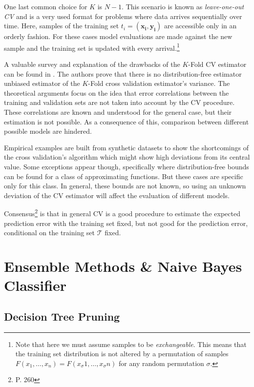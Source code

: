One last common choice for $K$ is $N-1$.
This scenario is known as \textit{leave-one-out CV} and is a very used format for problems where data arrives sequentially over time.
Here, samples of the training set $t_i = ( \boldsymbol{x_i} , \boldsymbol{y_i} )$ are accessible only in an orderly fashion.
For these cases model evaluations are made against the new sample and the training set is updated with every arrival.\footnote{Note that here we must assume samples to be \textit{exchangeable}.
    This means that the training set distribution is not altered by a permutation of samples $F(x_1,\ldots,x_n ) = F(x_\sigma{1},\ldots,x_\sigma{n})$ for any random permutation $\sigma$.}

A valuable survey and explanation of the drawbacks of the $K$-Fold CV estimator can be found in \citep{bengio-unbiasedCvEstimator}.
The authors prove that there is no distribution-free estimator unbiased estimator of the $K$-Fold cross validation estimator's variance.
The theoretical arguments focus on the idea that error correlations between the training and validation sets are not taken into account by the CV procedure.
These correlations are known and understood for the general case, but their estimation is not possible.
As a consequence of this, comparison between different possible models are hindered.

Empirical examples are built from synthetic datasets to show the shortcomings of the cross validation's algorithm which might show high deviations from its central value.
Some exceptions appear though, specifically where distribution-free bounds can be found for a class of approximating functions.
But these cases are specific only for this class.
In general, these bounds are not known, so using an unknown deviation of the CV estimator will affect the evaluation of different models.

Consensus\footnote{\citep{hastie-elemstatslearn} P.
    260} is that in general CV is a good procedure to estimate the expected prediction error with the training set fixed, but not good for the prediction error, conditional on the training set $\mathcal{T}$ fixed.



\chapter{Ensemble Methods \& Naive Bayes Classifier}\label{appx:ensembleBayes}

\section{Decision Tree Pruning}\label{appx:sec:tree_pruning}

